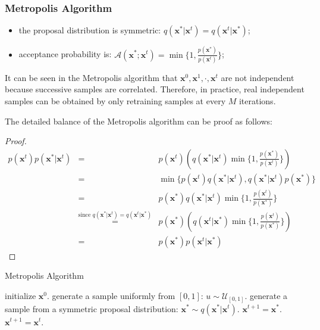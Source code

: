 \subsubsection{Metropolis Algorithm}
\begin{itemize}
	\item the proposal distribution is symmetric: $q(\mathbf{x}^*|\mathbf{x}^t)=q(\mathbf{x}^t|\mathbf{x}^*)$;
	\item acceptance probability is: $\mathcal{A}(\mathbf{x}^*;\mathbf{x}^t) = \min\{1, \frac{p(\mathbf{x}^*)}{p(\mathbf{x}^t)}\}$; 
\end{itemize}
It can be seen in the Metropolis algorithm that  $\mathbf{x}^0,\mathbf{x}^1,\cdot, \mathbf{x}^t$ are not independent because successive samples are correlated. Therefore, in practice, real independent 
samples can be obtained by only retraining samples at every $M$ iterations. 

The detailed balance of the Metropolis algorithm can be proof as follows:
\begin{proof}
	\begin{equation}
		\begin{array}{rcl}
			p(\mathbf{x}^t)p(\mathbf{x}^*|\mathbf{x}^t)&=&p(\mathbf{x}^t)\left(q(\mathbf{x}^*|\mathbf{x}^t)\min\{1,\frac{p(\mathbf{x}^*)}{p(\mathbf{x}^t)}\}\right) \\
												       &=& \min\{p(\mathbf{x}^t)q(\mathbf{x}^*|\mathbf{x}^t),q(\mathbf{x}^*|\mathbf{x}^t)p(\mathbf{x}^*) \}  \\
			                                           &=&p(\mathbf{x}^*)q(\mathbf{x}^*|\mathbf{x}^t)\min\{1,\frac{p(\mathbf{x}^t)}{p(\mathbf{x}^*)}\} \\
																											 &\overset{\text{since } q(\mathbf{x}^*|\mathbf{x}^t)=q(\mathbf{x}^t|\mathbf{x}^*)}=& p(\mathbf{x}^*)\left(q(\mathbf{x}^t|\mathbf{x}^*) \min\{1,\frac{p(\mathbf{x}^t)}{p(\mathbf{x}^*)}\} \right) \\
																							  &=& p(\mathbf{x}^*)p(\mathbf{x}^t|\mathbf{x}^*)
	   \end{array}
	\end{equation}
\end{proof}

\begin{algorithm}[t]
	\caption{Metropolis Algorithm}
	\label{alg:LBP}
\begin{algorithmic}[1]
\STATE initialize $\mathbf{x}^0$.
\STATE generate a sample uniformly from $[0,1]$: $u\sim \mathcal{U}_{[0,1]}$.
\STATE generate a sample from a symmetric proposal distribution: $\mathbf{x}^*\sim q(\mathbf{x}^*|\mathbf{x}^t)$.
\STATE $\mathbf{x}^{t+1}=\mathbf{x}^*$.
\ELSE 
\STATE $\mathbf{x}^{t+1}=\mathbf{x}^t$.
\ENDIF
\ENDFOR
\end{algorithmic}
\end{algorithm}

